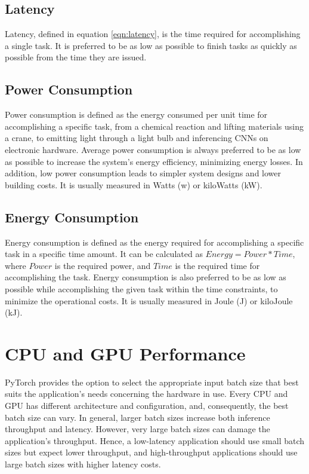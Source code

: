 \subsection{Latency}
Latency, defined in equation \ref{eqn:latency}, is the time required for accomplishing a single task. It is preferred to be as low as possible to finish tasks as quickly as possible from the time they are issued.

\subsection{Power Consumption}
Power consumption is defined as the energy consumed per unit time for accomplishing a specific task, from a chemical reaction and lifting materials using a crane, to emitting light through a light bulb and inferencing CNNs on electronic hardware. Average power consumption is always preferred to be as low as possible to increase the system's energy efficiency, minimizing energy losses. In addition, low power consumption leads to simpler system designs and lower building costs. It is usually measured in Watts (w) or kiloWatts (kW).

\subsection{Energy Consumption}
Energy consumption is defined as the energy required for accomplishing a specific task in a specific time amount. It can be calculated as $Energy = Power * Time$, where $Power$ is the required power, and $Time$ is the required time for accomplishing the task. Energy consumption is also preferred to be as low as possible while accomplishing the given task within the time constraints, to minimize the operational costs. It is usually measured in Joule (J) or kiloJoule (kJ).

\section{CPU and GPU Performance}
PyTorch provides the option to select the appropriate input batch size that best suits the application's needs concerning the hardware in use. Every CPU and GPU has different architecture and configuration, and, consequently, the best batch size can vary. In general, larger batch sizes increase both inference throughput and latency. However, very large batch sizes can damage the application's throughput. Hence, a low-latency application should use small batch sizes but expect lower throughput, and high-throughput applications should use large batch sizes with higher latency costs.

